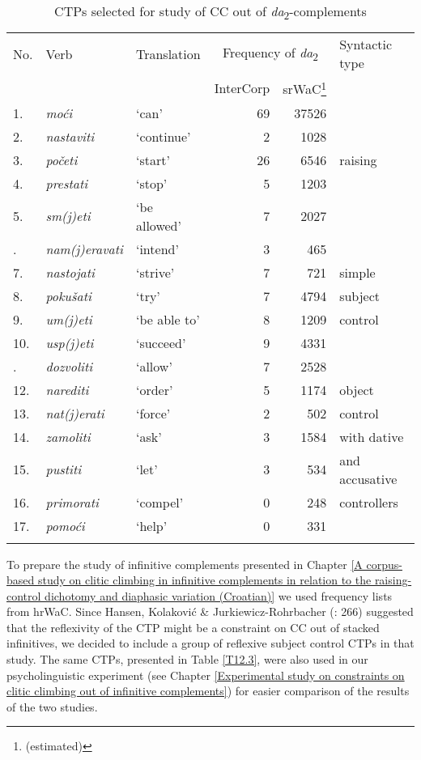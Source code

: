 \clearpage
\begin{table}
\caption[CTPs selected for study of CC out of \textit{da}\textsubscript{2}-complements]{CTPs selected for study of CC out of \textit{da}\textsubscript{2}-complements\label{T12.2}}

\begin{tabularx}{\textwidth}{Xllrrl}
\lsptoprule
No. & Verb & Translation & \multicolumn{2}{c}{Frequency of \textit{da}\textsubscript{2}}  & Syntactic type \\\cmidrule(lr){4-5}
    &      &             & InterCorp & srWaC\footnote{(estimated)}\\\midrule
1.&\textit{moći} &‘can’&69&37526&\\
2.&\textit{nastaviti}&‘continue’&2&1028&\\
3. &\textit{početi} &‘start’ &26 & 6546& raising\\
4. &\textit{prestati} &‘stop’ &5 &1203&\\
5. &\textit{sm(j)eti}  &‘be allowed’ &7 &2027&\\
\tablevspace
6.&\textit{nam(j)eravati}  &‘intend’ &3 &465&\\
7. &\textit{nastojati}  &‘strive’ &7 &721&simple\\
8. &\textit{pokušati}  &‘try’ &7 &4794&subject\\
9. &\textit{um(j)eti}  &‘be able to’ &8 &1209&control\\
10. &\textit{usp(j)eti}  &‘succeed’ &9 &4331&\\
\tablevspace
11. &\textit{dozvoliti}  &‘allow’ &7 &2528&\\
12. &\textit{narediti}  &‘order’ &5 &1174&object\\
13. &\textit{nat(j)erati}  &‘force’ &2 &502&control\\
14. &\textit{zamoliti}  &‘ask’ &3 &1584& with dative\\
15. &\textit{pustiti}  &‘let’ &3 &534&and accusative\\
16. &\textit{primorati}  &‘compel’ &0 &248&controllers\\
17. &\textit{pomoći}  &‘help’ &0 &331&\\
\lspbottomrule
\end{tabularx}
\end{table}


To prepare the study of infinitive complements presented in Chapter \ref{A corpus-based study on clitic climbing in infinitive complements in relation to the raising-control dichotomy and diaphasic variation (Croatian)} we used frequency lists from hrWaC.  Since Hansen, Kolaković \& Jurkiewicz-Rohr\-ba\-cher (\citeyear{HKJ18}: 266) suggested that the reflexivity of the CTP might be a constraint on CC out of stacked infinitives, we decided to include a group of reflexive subject control CTPs in that study. The same CTPs, presented in Table \ref{T12.3}, were also used  in our psycholinguistic experiment (see Chapter \ref{Experimental study on constraints on clitic climbing out of infinitive complements}) for easier comparison of the results of the two studies.

